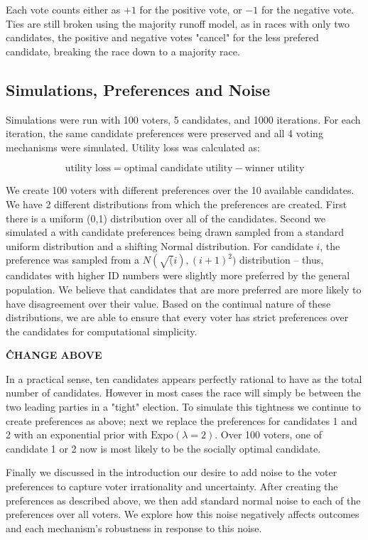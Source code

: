 \documentclass[11pt]{scrartcl}
\newcommand{\Expo}{\textrm{Expo}}
\begin{document}
Each vote counts either as $+1$ for the positive vote, or $-1$ for the negative vote. Ties are still broken using the majority runoff model, as in races with only two candidates, the positive and negative votes "cancel" for the less prefered candidate, breaking the race down to a majority race.

\subsection{Simulations, Preferences and Noise}

Simulations were run with 100 voters, 5 candidates, and 1000 iterations. For each iteration, the same candidate preferences were preserved and all 4 voting mechanisms were simulated. Utility loss was calculated as:

\[\textrm{utility loss} = \textrm{optimal candidate utility} - \textrm{winner utility}\]

We create 100 voters with different preferences over the 10 available candidates. We have 2 different distributions from which the preferences are created. First there is a uniform (0,1) distribution over all of the candidates. Second we simulated a with candidate preferences being drawn sampled from a standard uniform distribution and a shifting Normal distribution. For candidate $i$, the preference was sampled from a $N(\sqrt(i), (i + 1)^2)$ distribution -- thus, candidates with higher ID numbers were slightly more preferred by the general population. We believe that candidates that are more preferred are more likely to have disagreement over their value. Based on the continual nature of these distributions, we are able to ensure that every voter has strict preferences over the candidates for computational simplicity.

\textbf{\^ CHANGE ABOVE}


In a practical sense, ten candidates appears perfectly rational to have as the total number of candidates. However in most cases the race will simply be between the two leading parties in a "tight" election. To simulate this tightness we continue to create preferences as above; next we replace the preferences for candidates 1 and 2 with an exponential prior with $\Expo(\lambda = 2)$. Over 100 voters, one of candidate 1 or 2 now is most likely to be the socially optimal candidate.

Finally we discussed in the introduction our desire to add noise to the voter preferences to capture voter irrationality and uncertainty. After creating the preferences as described above, we then add standard normal noise to each of the preferences over all voters. We explore how this noise negatively affects outcomes and each mechanism's robustness in response to this noise.
\end{document}
